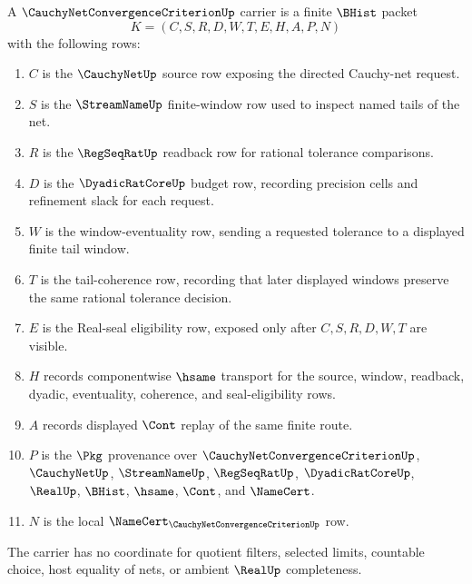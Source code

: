 \begin{definition}
\label{def:cauchy-net-convergence-criterion-carrier}
A $\CauchyNetConvergenceCriterionUp$ carrier is a finite $\BHist$ packet
$$
K=(C,S,R,D,W,T,E,H,A,P,N)
$$
with the following rows:
\begin{enumerate}
\item $C$ is the $\CauchyNetUp$ source row exposing the directed Cauchy-net request.
\item $S$ is the $\StreamNameUp$ finite-window row used to inspect named tails of the net.
\item $R$ is the $\RegSeqRatUp$ readback row for rational tolerance comparisons.
\item $D$ is the $\DyadicRatCoreUp$ budget row, recording precision cells and refinement slack for each request.
\item $W$ is the window-eventuality row, sending a requested tolerance to a displayed finite tail window.
\item $T$ is the tail-coherence row, recording that later displayed windows preserve the same rational tolerance decision.
\item $E$ is the Real-seal eligibility row, exposed only after $C,S,R,D,W,T$ are visible.
\item $H$ records componentwise $\hsame$ transport for the source, window, readback, dyadic, eventuality, coherence, and seal-eligibility rows.
\item $A$ records displayed $\Cont$ replay of the same finite route.
\item $P$ is the $\Pkg$ provenance over $\CauchyNetConvergenceCriterionUp$, $\CauchyNetUp$, $\StreamNameUp$, $\RegSeqRatUp$, $\DyadicRatCoreUp$, $\RealUp$, $\BHist$, $\hsame$, $\Cont$, and $\NameCert$.
\item $N$ is the local $\NameCert_{\CauchyNetConvergenceCriterionUp}$ row.
\end{enumerate}
The carrier has no coordinate for quotient filters, selected limits, countable choice, host equality of nets, or ambient $\RealUp$ completeness.
\end{definition}

